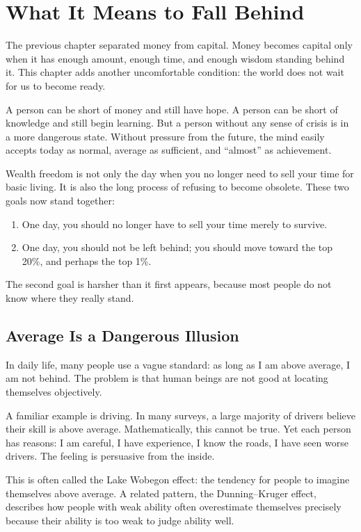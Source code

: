 \chapter{What It Means to Fall Behind}

The previous chapter separated money from capital. Money becomes capital only when it has enough amount, enough time, and enough wisdom standing behind it. This chapter adds another uncomfortable condition: the world does not wait for us to become ready.

A person can be short of money and still have hope. A person can be short of knowledge and still begin learning. But a person without any sense of crisis is in a more dangerous state. Without pressure from the future, the mind easily accepts today as normal, average as sufficient, and ``almost'' as achievement.

Wealth freedom is not only the day when you no longer need to sell your time for basic living. It is also the long process of refusing to become obsolete. These two goals now stand together:

\begin{enumerate}
\item One day, you should no longer have to sell your time merely to survive.
\item One day, you should not be left behind; you should move toward the top 20\%, and perhaps the top 1\%.
\end{enumerate}

The second goal is harsher than it first appears, because most people do not know where they really stand.

\section*{Average Is a Dangerous Illusion}

In daily life, many people use a vague standard: as long as I am above average, I am not behind. The problem is that human beings are not good at locating themselves objectively.

A familiar example is driving. In many surveys, a large majority of drivers believe their skill is above average. Mathematically, this cannot be true. Yet each person has reasons: I am careful, I have experience, I know the roads, I have seen worse drivers. The feeling is persuasive from the inside.

This is often called the Lake Wobegon effect: the tendency for people to imagine themselves above average. A related pattern, the Dunning--Kruger effect, describes how people with weak ability often overestimate themselves precisely because their ability is too weak to judge ability well.

